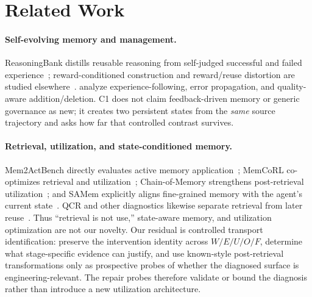 \section{Related Work}
\paragraph{Self-evolving memory and management.} ReasoningBank distills reusable reasoning from self-judged successful and failed experience~\citep{ouyang2026reasoningbank}; reward-conditioned construction and reward/reuse distortion are studied elsewhere~\citep{wang2025memalpha,asadolahi2026inflation,yang2026romerl}. \citet{xiong2026memorymanagement} analyze experience-following, error propagation, and quality-aware addition/deletion. C1 does not claim feedback-driven memory or generic governance as new; it creates two persistent states from the \emph{same} source trajectory and asks how far that controlled contrast survives.

\paragraph{Retrieval, utilization, and state-conditioned memory.} Mem2ActBench directly evaluates active memory application~\citep{shen2026mem2actbench}; MemCoRL co-optimizes retrieval and utilization~\citep{liu2026memcorl}; Chain-of-Memory strengthens post-retrieval utilization~\citep{xu2026chainofmemory}; and SAMem explicitly aligns fine-grained memory with the agent's current state~\citep{wang2026samem}. QCR and other diagnostics likewise separate retrieval from later reuse~\citep{li2026qcr,yuan2026retrievalutilization}. Thus ``retrieval is not use,'' state-aware memory, and utilization optimization are not our novelty. Our residual is controlled transport identification: preserve the intervention identity across $W/E/U/O/F$, determine what stage-specific evidence can justify, and use known-style post-retrieval transformations only as prospective probes of whether the diagnosed surface is engineering-relevant. The repair probes therefore validate or bound the diagnosis rather than introduce a new utilization architecture.
